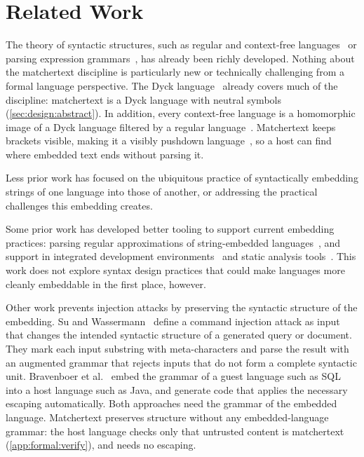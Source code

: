\section{Related Work}
\label{sec:rel}

The theory of syntactic structures,
such as regular and
context-free languages~\cite{chomsky63algebraic}
or parsing expression grammars~\cite{ford04popl},
has already been richly developed.
Nothing about the matchertext discipline
is particularly new or technically challenging
from a formal language perspective.
The Dyck language~\cite{chomsky63algebraic} already covers much of the discipline:
matchertext is a Dyck language with neutral symbols (\cref{sec:design:abstract}). In addition,
every context-free language is a homomorphic image
of a Dyck language filtered by a regular language~\cite{chomsky63algebraic}.
Matchertext keeps brackets visible,
making it a visibly pushdown
language~\cite{alur04visibly,mehlhorn80pebbling},
so a host can find where embedded text ends without parsing it.

Less prior work has focused on
the ubiquitous practice of syntactically embedding
strings of one language into those of another,
or addressing the practical challenges this embedding creates.

Some prior work has developed better tooling
to support current embedding practices:
\eg parsing regular approximations
of string-embedded languages~\cite{verbitskaia15relaxed},
and support in
integrated development environments~\cite{grigorev14string}
and static analysis tools~\cite{khabibullin15development}.
This work does not explore syntax design practices
that could make languages more cleanly embeddable in the first place, however.

Other work prevents injection attacks
by preserving the syntactic structure of the embedding.
Su and Wassermann~\cite{su06essence} define a command injection attack
as input that changes the intended syntactic structure
of a generated query or document.
They mark each input substring with meta-characters
and parse the result with an augmented grammar
that rejects inputs that do not form a complete syntactic unit.
Bravenboer et al.~\cite{bravenboer07preventing}
embed the grammar of a guest language such as SQL
into a host language such as Java,
and generate code that applies the necessary escaping automatically.
Both approaches need the grammar of the embedded language.
Matchertext preserves structure without any embedded-language grammar:
the host language checks only that untrusted content is matchertext
(\cref{app:formal:verify}),
and needs no escaping.

